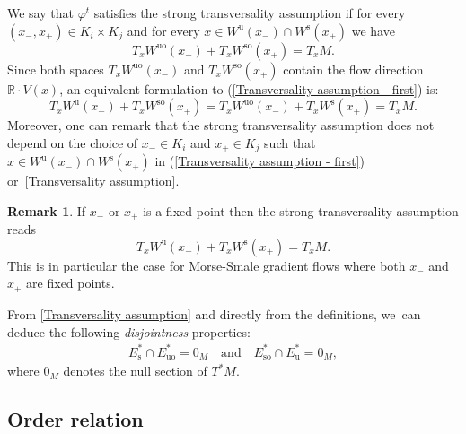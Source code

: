 \documentclass[JEP,XML,SOM,Unicode,NoEqCountersInSection,NoFloatCountersInSection,published]{cedram}
\newcommand{\rs}{\mathrm{s}}
\newcommand{\rso}{\mathrm{so}}
\newcommand{\ru}{\mathrm{u}}
\newcommand{\ruo}{\mathrm{uo}}
\theoremstyle{definition}
\newtheorem{remark}[definition]{Remark}
\theoremstyle{plain}
\newcommand{\R}{\mathbb{R}}
\begin{document}
We say that $\varphi^t$ satisfies the strong transversality assumption if for every $(x_-,x_+) \in K_i \times K_j$ and for every $x \in W^\ru (x_-) \cap W^\rs (x_+)$ we have
\begin{equation}\label{Transversality assumption - first}
T_x W^{\ruo} (x_-) + T_x W^{\rso} (x_+) = T_x M.
\end{equation}
Since both spaces $T_x W^{\ruo} (x_-) $ and $T_x W^{\rso} (x_+)$ contain the flow direction $\R\cdot V(x)$, an equivalent formulation to (\ref{Transversality assumption - first}) is:
\begin{equation}\label{Transversality assumption}
T_x W^{\ru} (x_-) + T_x W^{\rso} (x_+) = T_x W^{\ruo} (x_-) + T_x W^{\rs} (x_+) = T_x M.
\end{equation}
Moreover, one can remark that the strong transversality assumption does not depend on the choice of $x_- \in K_i$ and $x_+ \in K_j$ such that $x \in W^\ru (x_-) \cap W^\rs (x_+)$ in (\ref{Transversality assumption - first}) or~\eqref{Transversality assumption}.
\begin{remark}If $x_-$ or $x_+$ is a fixed point then the strong transversality assumption reads
\[
T_x W^{\ru} (x_-) + T_x W^{\rs} (x_+) = T_x M.
\]
This is in particular the case for Morse-Smale gradient flows \cite{DR0} where both $x_-$ and~$x_+$ are fixed points.
\end{remark}

From \eqref{Transversality assumption} and directly from the definitions, we~can deduce the following \textit{disjointness} properties:
\begin{align*}
E_\rs^* \cap E_{\ruo}^* = 0_M \quad\text{and}\quad E_{\rso}^* \cap E_\ru^* = 0_M,
\end{align*}
where $0_M$ denotes the null section of $T^*M$.

\subsection{Order relation}
\end{document}
